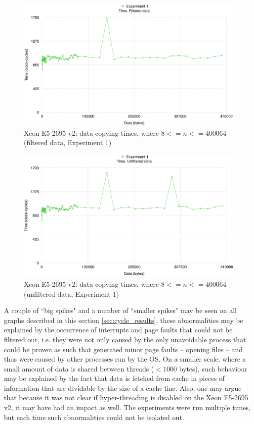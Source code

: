 \begin{figure}[!htb]
\centering
\includegraphics[width=145mm]{6/Cycle_experiment_clean_ichec_small.png}
\caption{Xeon E5-2695 v2: data copying times, where $8 <= n <= 400064$ (filtered data, Experiment 1)}
\label{Cycle_experiment_clean_ichec_small}
\end{figure}

\begin{figure}[!htb]
\centering
\includegraphics[width=145mm]{6/Cycle_experiment_dirty_ichec_small.png}
\caption{Xeon E5-2695 v2: data copying times, where $8 <= n <= 400064$ (unfiltered data, Experiment 1)}
\label{Cycle_experiment_dirty_ichec_small}
\end{figure}

A couple of ``big spikes" and a number of ``smaller spikes" may be seen on all graphs described in this section \ref{sec:cycle_results}, these abnormalities may be explained by the occurrence of interrupts and page faults that could not be filtered out, i.e. they were not only caused by the only unavoidable process that could be proven as such that generated minor page faults – opening files – and thus were caused by other processes run by the OS. On a smaller scale, where a small amount of data is shared between threads ($< 1000$ bytes), such behaviour may be explained by the fact that data is fetched from cache in pieces of information that are dividable by the size of a cache line. Also, one may argue that because it was not clear if hyper-threading is disabled on the Xeon E5-2695 v2, it may have had an impact as well. The experiments were run multiple times, but each time such abnormalities could not be isolated out.

